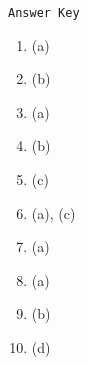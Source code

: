 \begin{center}
\texttt{Answer Key}
\begin{multicols}{5}
\begin{enumerate}
\item (a)
\item (b)
\item (a)
\item (b)
\item (c)
\item (a), (c)
\item (a)
\item (a)
\item (b)
\item (d)
\end{enumerate}
\end{multicols}
\end{center}
